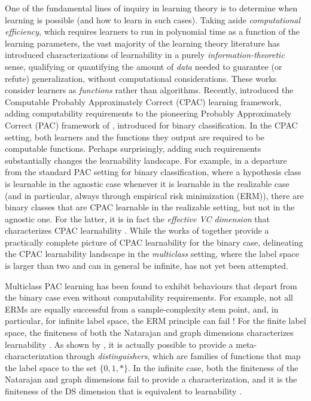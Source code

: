 \documentclass[11pt]{article}
\begin{document}
One of the fundamental lines of inquiry in learning theory is to determine when learning is possible (and how to learn in such cases).
Taking aside \emph{computational efficiency}, which requires learners to run in polynomial time as a function of the learning parameters, the vast majority of the learning theory literature has introduced characterizations of learnability in a purely \emph{information-theoretic} sense, qualifying or quantifying the amount of \emph{data} needed to  guarantee (or refute) generalization, without computational considerations.
These works consider learners as \emph{functions} rather than algorithms.
Recently, \cite{agarwal2020learnability} introduced the Computable Probably Approximately Correct (CPAC) learning framework, adding computability requirements to the pioneering Probably Approximately Correct (PAC) framework of \cite{valiant1984theory}, introduced for binary classification.
In the CPAC setting, both learners and the functions they output are required to be computable functions.
Perhaps surprisingly, adding such requirements substantially changes the learnability landscape.
For example, in a departure from the standard PAC setting for binary classification, where a hypothesis class is learnable in the agnostic case whenever it is learnable in the realizable case (and in particular, always through empirical risk minimization (ERM)), there are binary classes that are CPAC learnable in the realizable setting, but not in the agnostic one. 
For the latter, it is in fact the \emph{effective VC dimension} that characterizes CPAC learnability  \citep{sterkenburg2022characterizations,delle2023find}.
While the works of \cite{agarwal2020learnability,sterkenburg2022characterizations,delle2023find} together provide a practically complete picture of CPAC learnability for the binary case, delineating the CPAC learnability landscape in the \emph{multiclass} setting, where the label space is larger than two and can in general be infinite, has not yet been attempted. 

Multiclass PAC learning has been found to exhibit  behaviours that depart from the binary case even without computability requirements.
For example, not all ERMs are equally successful from a sample-complexity stem point, and, in particular, for infinite label space, the ERM principle can fail \citep{daniely2011multiclass}!
For the finite label space, the finiteness of both the Natarajan and graph dimensions characterizes learnability \citep{natarajan1988two,natarajan1989learning}.
As shown by \cite{ben1992characterizations}, it is actually possible to provide a meta-characterization through \emph{distinguishers}, which are families of functions that map the label space to the set $\{0,1,*\}$.
In the infinite case, both the finiteness of the Natarajan and graph dimensions fail to provide a characterization, and it is the finiteness of the DS dimension that is equivalent to learnability \citep{daniely2014optimal,brukhim2022characterization}.
\end{document}
